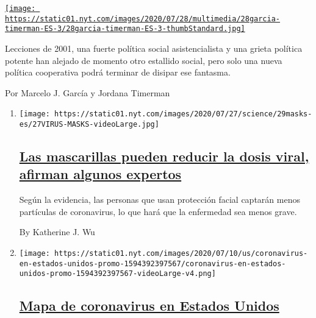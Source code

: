\begin{enumerate}
\begin{enumerate}
    \href{/es/2020/07/28/espanol/opinion/argentina-estallido-2001-coronavirus.html}{\texttt{[image: https://static01.nyt.com/images/2020/07/28/multimedia/28garcia-timerman-ES-3/28garcia-timerman-ES-3-thumbStandard.jpg]}}

    Lecciones de 2001, una fuerte política social asistencialista y una
    grieta política potente han alejado de momento otro estallido
    social, pero solo una nueva política cooperativa podrá terminar de
    disipar ese fantasma.

    Por Marcelo J. García y Jordana Timerman
  \end{enumerate}
\end{enumerate}

\begin{enumerate}
\def\labelenumi{\arabic{enumi}.}
\item
  \texttt{[image: https://static01.nyt.com/images/2020/07/27/science/29masks-es/27VIRUS-MASKS-videoLarge.jpg]}

  \hypertarget{las-mascarillas-pueden-reducir-la-dosis-viral-afirman-algunos-expertos}{%
  \subsection{\texorpdfstring{\href{/es/2020/07/29/espanol/ciencia-y-tecnologia/proteccion-cubrebocas-coronavirus.html}{Las
  mascarillas pueden reducir la dosis viral, afirman algunos
  expertos}}{Las mascarillas pueden reducir la dosis viral, afirman algunos expertos}}\label{las-mascarillas-pueden-reducir-la-dosis-viral-afirman-algunos-expertos}}

  Según la evidencia, las personas que usan protección facial captarán
  menos partículas de coronavirus, lo que hará que la enfermedad sea
  menos grave.

  By Katherine J. Wu
\item
  \texttt{[image: https://static01.nyt.com/images/2020/07/10/us/coronavirus-en-estados-unidos-promo-1594392397567/coronavirus-en-estados-unidos-promo-1594392397567-videoLarge-v4.png]}

  \hypertarget{mapa-de-coronavirus-en-estados-unidos}{%
  \subsection{\texorpdfstring{\href{/es/interactive/2020/espanol/mundo/coronavirus-en-estados-unidos.html}{Mapa
  de coronavirus en Estados
  Unidos}}{Mapa de coronavirus en Estados Unidos}}\label{mapa-de-coronavirus-en-estados-unidos}}


\end{enumerate}
